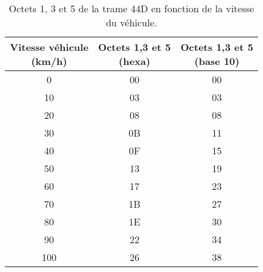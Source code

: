 \documentclass{rapportECC}
\begin{document}
\begin{comment}
    \begin{table}[H]
    \begin{tabular}{|l|l|l|}
    \hline
    \textbf{Vitesse véhicule (tr/min)} & \textbf{Octets 1,3 et 5 (hexa)} & \textbf{Otets 1,3 et 5  (base 10)} \\ \hline
    0  & 00       & 00 \\
    10 & 03       & 03 \\
    20 & 08       & 08 \\
    30 & 0B       & 11 \\
    40 & 0F       & 15\\   
    50 & 13       & 19\\
    60 & 17       & 23\\
    70 & 1B       & 27\\
    80 & 1E       & 30\\
    90 & 22       & 34\\  
    100& 26       & 38\\
    \end{tabular}
    \caption{Octets 1, 3 et 5 de la trame 44D en fonction de la vitesse du véhicule}
    \label{tab:vitesse véhicule trame 44D}
\end{table}
\end{comment}

\begingroup
\begin{table}[H]
    \centering
    \begin{tabular}{c c c}
    \toprule
    \makecell{\textbf{Vitesse véhicule}\\ \textbf{(km/h)}} & \makecell{\textbf{Octets 1,3 et 5}\\ \textbf{(hexa)}} & \makecell{\textbf{Octets 1,3 et 5}\\ \textbf{(base 10)}} \\
    \midrule
    0  & 00 & 00 \\
    10 & 03 & 03 \\
    20 & 08 & 08 \\
    30 & 0B & 11 \\
    40 & 0F & 15 \\   
    50 & 13 & 19 \\
    60 & 17 & 23 \\
    70 & 1B & 27 \\
    80 & 1E & 30 \\
    90 & 22 & 34 \\  
    100& 26 & 38 \\
    \bottomrule
    \end{tabular}
    \caption{Octets 1, 3 et 5 de la trame 44D en fonction de la vitesse du véhicule.}
    \label{tab:vitesse véhicule trame 44D}
\end{table}
\endgroup
\end{document}
